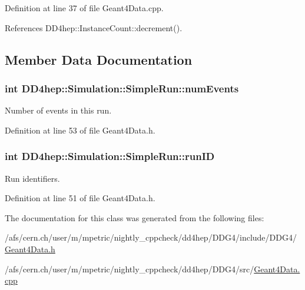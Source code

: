 Definition at line 37 of file Geant4Data.cpp.

References DD4hep::InstanceCount::decrement().

\subsection{Member Data Documentation}
\hypertarget{class_d_d4hep_1_1_simulation_1_1_simple_run_a7cbde1fd06c8893176d8d7b70386281d}{
\subsubsection[{numEvents}]{\setlength{\rightskip}{0pt plus 5cm}int {\bf DD4hep::Simulation::SimpleRun::numEvents}}}
\label{class_d_d4hep_1_1_simulation_1_1_simple_run_a7cbde1fd06c8893176d8d7b70386281d}


Number of events in this run. 

Definition at line 53 of file Geant4Data.h.\hypertarget{class_d_d4hep_1_1_simulation_1_1_simple_run_a8d376fdac80fb3d671037537ca3aa858}{
\subsubsection[{runID}]{\setlength{\rightskip}{0pt plus 5cm}int {\bf DD4hep::Simulation::SimpleRun::runID}}}
\label{class_d_d4hep_1_1_simulation_1_1_simple_run_a8d376fdac80fb3d671037537ca3aa858}


Run identifiers. 

Definition at line 51 of file Geant4Data.h.

The documentation for this class was generated from the following files:\begin{DoxyCompactItemize}
\item 
/afs/cern.ch/user/m/mpetric/nightly\_\-cppcheck/dd4hep/DDG4/include/DDG4/\hyperlink{_geant4_data_8h}{Geant4Data.h}\item 
/afs/cern.ch/user/m/mpetric/nightly\_\-cppcheck/dd4hep/DDG4/src/\hyperlink{_geant4_data_8cpp}{Geant4Data.cpp}\end{DoxyCompactItemize}

